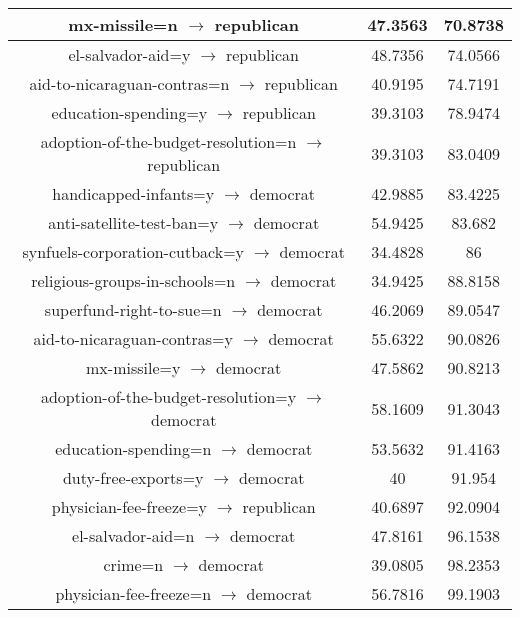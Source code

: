 \documentclass[11pt]{scrartcl}
\begin{document}
\begin{tabular}{|c|c|c|}
	mx-missile=n $\rightarrow$ republican & 47.3563 & 70.8738\\ \hline
	el-salvador-aid=y $\rightarrow$ republican & 48.7356 & 74.0566\\ \hline
	aid-to-nicaraguan-contras=n $\rightarrow$ republican & 40.9195 & 74.7191\\ \hline
	education-spending=y $\rightarrow$ republican & 39.3103 & 78.9474\\ \hline
	adoption-of-the-budget-resolution=n $\rightarrow$ republican & 39.3103 & 83.0409\\ \hline
	handicapped-infants=y $\rightarrow$ democrat & 42.9885 & 83.4225\\ \hline
	anti-satellite-test-ban=y $\rightarrow$ democrat & 54.9425 & 83.682\\ \hline
	synfuels-corporation-cutback=y $\rightarrow$ democrat & 34.4828 & 86\\ \hline
	religious-groups-in-schools=n $\rightarrow$ democrat & 34.9425 & 88.8158\\ \hline
	superfund-right-to-sue=n $\rightarrow$ democrat & 46.2069 & 89.0547\\ \hline
	aid-to-nicaraguan-contras=y $\rightarrow$ democrat & 55.6322 & 90.0826\\ \hline
	mx-missile=y $\rightarrow$ democrat & 47.5862 & 90.8213\\ \hline
	adoption-of-the-budget-resolution=y $\rightarrow$ democrat & 58.1609 & 91.3043\\ \hline
	education-spending=n $\rightarrow$ democrat & 53.5632 & 91.4163\\ \hline
	duty-free-exports=y $\rightarrow$ democrat & 40 & 91.954\\ \hline
	physician-fee-freeze=y $\rightarrow$ republican & 40.6897 & 92.0904\\ \hline
	el-salvador-aid=n $\rightarrow$ democrat & 47.8161 & 96.1538\\ \hline
	crime=n $\rightarrow$ democrat & 39.0805 & 98.2353\\ \hline
	physician-fee-freeze=n $\rightarrow$ democrat & 56.7816 & 99.1903\\ \hline
\end{tabular}
\end{document}
